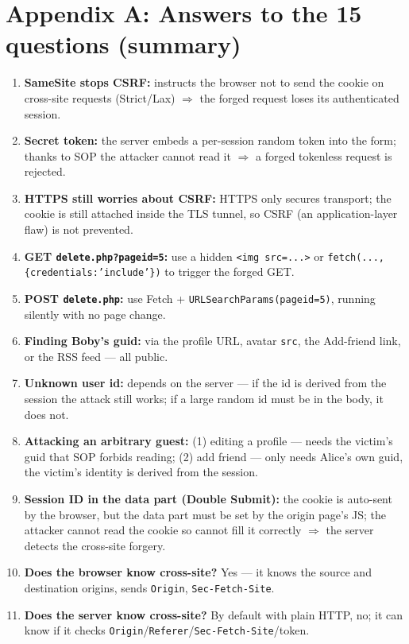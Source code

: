 \documentclass[11pt,a4paper]{article}
\begin{document}
\section{Appendix A: Answers to the 15 questions (summary)}
\small
\begin{enumerate}[leftmargin=2.2em]
\item \textbf{SameSite stops CSRF:} instructs the browser not to send the cookie on cross-site requests (Strict/Lax) $\Rightarrow$ the forged request loses its authenticated session.
\item \textbf{Secret token:} the server embeds a per-session random token into the form; thanks to SOP the attacker cannot read it $\Rightarrow$ a forged tokenless request is rejected.
\item \textbf{HTTPS still worries about CSRF:} HTTPS only secures transport; the cookie is still attached inside the TLS tunnel, so CSRF (an application-layer flaw) is not prevented.
\item \textbf{GET \texttt{delete.php?pageid=5}:} use a hidden \texttt{<img src=...>} or \texttt{fetch(...,\{credentials:'include'\})} to trigger the forged GET.
\item \textbf{POST \texttt{delete.php}:} use Fetch + \texttt{URLSearchParams(pageid=5)}, running silently with no page change.
\item \textbf{Finding Boby's guid:} via the profile URL, avatar \texttt{src}, the Add-friend link, or the RSS feed — all public.
\item \textbf{Unknown user id:} depends on the server — if the id is derived from the session the attack still works; if a large random id must be in the body, it does not.
\item \textbf{Attacking an arbitrary guest:} (1) \no{} editing a profile — needs the victim's guid that SOP forbids reading; (2) \yes{} add friend — only needs Alice's own guid, the victim's identity is derived from the session.
\item \textbf{Session ID in the data part (Double Submit):} the cookie is auto-sent by the browser, but the data part must be set by the origin page's JS; the attacker cannot read the cookie so cannot fill it correctly $\Rightarrow$ the server detects the cross-site forgery.
\item \textbf{Does the browser know cross-site?} Yes — it knows the source and destination origins, sends \texttt{Origin}, \texttt{Sec-Fetch-Site}.
\item \textbf{Does the server know cross-site?} By default with plain HTTP, no; it can know if it checks \texttt{Origin}/\texttt{Referer}/\texttt{Sec-Fetch-Site}/token.

\end{enumerate}
\end{document}
